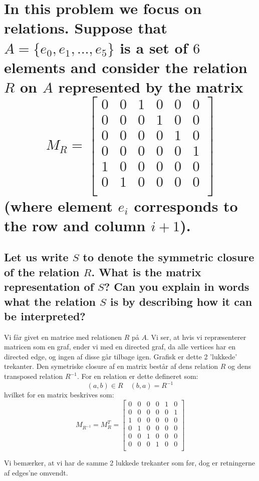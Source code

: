 \documentclass[a4paper,12pt]{article}
\begin{document}
\section[Question 4]{In this problem we focus on relations. Suppose that $A = \{e_0,e_1,\dots,e_5\}$ is a set of
$6$ elements and consider the relation $R$ on $A$ represented by the matrix
\[M_R = 
    \begin{bmatrix}
        0 & 0 & 1 & 0 & 0 & 0 \\
        0 & 0 & 0 & 1 & 0 & 0 \\
        0 & 0 & 0 & 0 & 1 & 0 \\
        0 & 0 & 0 & 0 & 0 & 1 \\
        1 & 0 & 0 & 0 & 0 & 0 \\
        0 & 1 & 0 & 0 & 0 & 0 \\
    \end{bmatrix}
\]
(where element $e_i$ corresponds to the row and column $i+1$).}
\subsection[]{Let us write $S$ to denote the symmetric closure of the relation $R$. 
What is the matrix representation of $S$? Can you explain in words what the relation $S$ is by describing how it can be interpreted?
}

Vi får givet en matrice med relationen $R$ på $A$. Vi ser, at hvis vi repræsenterer matricen som en graf, ender vi med en directed graf, da alle vertices har en directed edge, og ingen af disse går tilbage igen. Grafisk er dette 2 'lukkede' trekanter. Den symetriske closure af en matrix består af dens relation $R$ og dens transposed relation $R^{-1}$. For en relation er dette defineret som: 
\[(a,b)\in R \quad (b,a)=R^{-1}\]
hvilket for en matrix beskrives som:
\[M_{R^{-1}} = M_{R}^T = 
    \begin{bmatrix}
        0 & 0 & 0 & 0 & 1 & 0 \\
        0 & 0 & 0 & 0 & 0 & 1 \\
        1 & 0 & 0 & 0 & 0 & 0 \\
        0 & 1 & 0 & 0 & 0 & 0 \\
        0 & 0 & 1 & 0 & 0 & 0 \\
        0 & 0 & 0 & 1 & 0 & 0 \\
    \end{bmatrix}
\]

Vi bemærker, at vi har de samme 2 lukkede trekanter som før, dog er retningerne af edges'ne omvendt.
\end{document}
